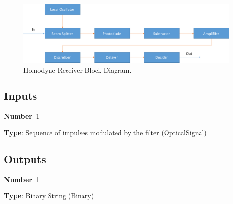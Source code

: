 \documentclass[../../sdf/tex/BPSK_system.tex]{subfiles}
\begin{document}
\begin{figure}[H]
\centering
\includegraphics[width=\linewidth]{homodyneblockdiagram.png}
\caption{Homodyne Receiver Block Diagram.}
\label{fig:physicalsystem}
\end{figure}

\subsection*{Inputs}

\textbf{Number}: 1

\textbf{Type}: Sequence of impulses modulated by the filter (OpticalSignal)

\subsection*{Outputs}

\textbf{Number}: 1

\textbf{Type}: Binary String (Binary)
\end{document}
